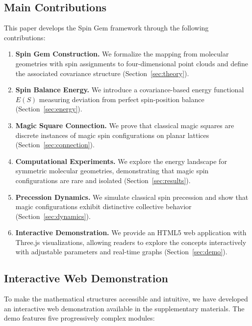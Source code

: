 \subsection{Main Contributions}

This paper develops the Spin Gem framework through the following contributions:

\begin{enumerate}
    \item \textbf{Spin Gem Construction.} We formalize the mapping from molecular geometries with spin assignments to four-dimensional point clouds and define the associated covariance structure (Section~\ref{sec:theory}).
    
    \item \textbf{Spin Balance Energy.} We introduce a covariance-based energy functional $E(S)$ measuring deviation from perfect spin-position balance (Section~\ref{sec:energy}).
    
    \item \textbf{Magic Square Connection.} We prove that classical magic squares are discrete instances of magic spin configurations on planar lattices (Section~\ref{sec:connection}).
    
    \item \textbf{Computational Experiments.} We explore the energy landscape for symmetric molecular geometries, demonstrating that magic spin configurations are rare and isolated (Section~\ref{sec:results}).
    
    \item \textbf{Precession Dynamics.} We simulate classical spin precession and show that magic configurations exhibit distinctive collective behavior (Section~\ref{sec:dynamics}).
    
    \item \textbf{Interactive Demonstration.} We provide an HTML5 web application with Three.js visualizations, allowing readers to explore the concepts interactively with adjustable parameters and real-time graphs (Section~\ref{sec:demo}).
\end{enumerate}

\subsection{Interactive Web Demonstration}

To make the mathematical structures accessible and intuitive, we have developed an interactive web demonstration available in the supplementary materials. The demo features five progressively complex modules:

